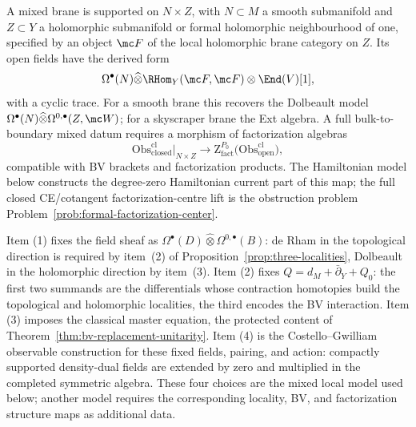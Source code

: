 \documentclass[11pt]{memoir}
\begin{document}
\begin{defn}
  A mixed brane is supported on \(N\times Z\), with \(N\subset M\) a
  smooth submanifold and \(Z\subset Y\) a holomorphic submanifold or
  formal holomorphic neighbourhood of one, specified by an object
  \(\mc F\) of the local holomorphic brane category on \(Z\).  Its
  open fields have the derived form
  \[
    \Omega^\bullet(N)\widehat\otimes
      \RHom_Y(\mc F,\mc F)\otimes\End(V)[1],
  \]
  with a cyclic trace.  For a smooth brane this recovers the
  Dolbeault model
  \(\Omega^\bullet(N)\widehat\otimes\Omega^{0,\bullet}(Z,\mc W)\);
  for a skyscraper brane the Ext algebra.  A full bulk-to-boundary
  mixed datum requires a morphism of factorization algebras
  \[
    \mathrm{Obs}^{\mathrm{cl}}_{\mathrm{closed}}\big|_{N\times Z}
    \longrightarrow
    \mathrm Z^{P_0}_{\mathrm{fact}}\bigl(
      \mathrm{Obs}^{\mathrm{cl}}_{\mathrm{open}}\bigr),
  \]
  compatible with BV brackets and factorization products.  The
  Hamiltonian model below constructs the degree-zero Hamiltonian
  current part of this map; the full closed CE/cotangent
  factorization-centre lift is the obstruction problem
  Problem~\ref{prob:formal-factorization-center}.
\end{defn}

\begin{rmk}
  Item (1) fixes the field sheaf as
  \(\Omega^\bullet(D)\widehat\otimes\Omega^{0,\bullet}(B)\): de Rham
  in the topological direction is required by item~(2) of
  Proposition~\ref{prop:three-localities}, Dolbeault in the
  holomorphic direction by item~(3).  Item (2) fixes
  \(Q=d_M+\bar\partial_Y+Q_0\): the first two summands are the
  differentials whose contraction homotopies build the topological
  and holomorphic localities, the third encodes the BV interaction.
  Item (3) imposes the classical master equation, the protected
  content of Theorem~\ref{thm:bv-replacement-unitarity}.  Item (4)
  is the Costello--Gwilliam observable construction for these fixed
  fields, pairing, and action: compactly supported density-dual fields
  are extended by zero and multiplied in the completed symmetric
  algebra.  These four choices are the mixed local model used below;
  another model requires the corresponding locality, BV, and
  factorization structure maps as additional data.
\end{rmk}
\end{document}

